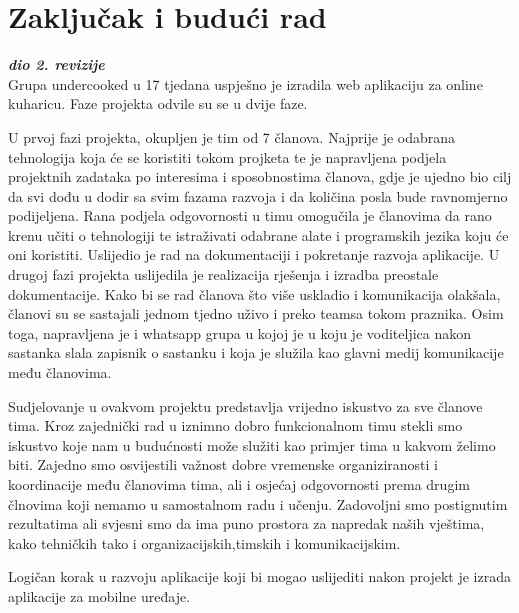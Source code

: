 \chapter{Zaključak i budući rad}
		
		\textbf{\textit{dio 2. revizije}}\\
		
		Grupa undercooked u 17 tjedana uspješno je izradila web aplikaciju za online kuharicu. Faze projekta odvile su se u dvije faze.
        
        U prvoj fazi projekta, okupljen je tim od 7 članova. Najprije je odabrana tehnologija koja će se koristiti tokom projketa te je napravljena podjela projektnih zadataka po interesima i sposobnostima članova, gdje je ujedno bio cilj da svi dođu u dodir sa svim fazama razvoja i da količina posla bude ravnomjerno podijeljena. Rana podjela odgovornosti u timu omogučila je članovima da rano krenu učiti o tehnologiji te istraživati odabrane alate i programskih jezika koju će oni koristiti. Uslijedio je rad na dokumentaciji i pokretanje razvoja aplikacije.
        U drugoj fazi projekta uslijedila je realizacija rješenja i izradba preostale dokumentacije. Kako bi se rad članova što više uskladio i komunikacija olakšala, članovi su se sastajali jednom tjedno uživo i preko teamsa tokom praznika. Osim toga, napravljena je i whatsapp grupa u kojoj je u koju je voditeljica nakon sastanka slala zapisnik o sastanku i koja je služila kao glavni medij komunikacije među članovima.
        
        Sudjelovanje u ovakvom projektu predstavlja vrijedno iskustvo za sve članove tima. Kroz zajednički rad u iznimno dobro funkcionalnom timu stekli smo iskustvo koje nam u budućnosti može služiti kao primjer tima u kakvom želimo biti. Zajedno smo osvijestili važnost dobre vremenske organiziranosti i koordinacije među članovima tima, ali i osjećaj odgovornosti prema drugim člnovima koji nemamo u samostalnom radu i učenju. Zadovoljni smo postignutim rezultatima ali svjesni smo da ima puno prostora za napredak naših vještima, kako tehničkih tako i organizacijskih,timskih i komunikacijskim.

        Logičan korak u razvoju aplikacije koji bi mogao uslijediti nakon projekt je izrada aplikacije za mobilne uređaje.
		\eject 